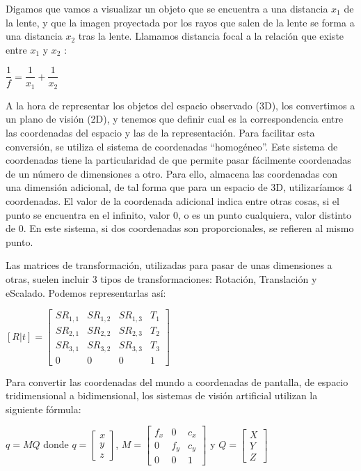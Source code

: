 Digamos que vamos a visualizar un objeto que se encuentra a una distancia $x_{1}$ de la lente, y que la imagen proyectada por los rayos que salen de la lente se forma a una distancia $x_{2}$ tras la lente. Llamamos distancia focal a la relación que existe entre $x_{1}$ y $x_{2}$ :
\begin{center}
$\dfrac{1}{f} = \dfrac{1}{x_{1}} + \dfrac{1}{x_{2}}$
\end{center}

A la hora de representar los objetos del espacio observado (3D), los convertimos a un plano de visión (2D), y tenemos que definir cual es la correspondencia entre las coordenadas del espacio y las de la representación. Para facilitar esta conversión, se utiliza el sistema de coordenadas “homogéneo”. Este sistema de coordenadas tiene la particularidad de que permite pasar fácilmente coordenadas de un número de dimensiones a otro. Para ello, almacena las coordenadas con una dimensión adicional, de tal forma que para un espacio de 3D, utilizaríamos 4 coordenadas. El valor de la coordenada adicional indica entre otras cosas, si el punto se encuentra en el infinito, valor 0, o es un punto cualquiera, valor distinto de 0. En este sistema, si dos coordenadas son proporcionales, se refieren al mismo punto.

Las matrices de transformación, utilizadas para pasar de unas dimensiones a otras, suelen incluir 3 tipos de transformaciones: Rotación, Translación y eScalado. Podemos representarlas así:
\begin{center}
$[R|t] = \begin{bmatrix} SR_{1,1} & SR_{1,2} & SR_{1,3} & T_{1}  \\
                                 SR_{2,1} & SR_{2,2} & SR_{2,3} & T_{2}  \\
                                 SR_{3,1} & SR_{3,2} & SR_{3,3} & T_{3}  \\
                                     0    &     0    &     0    &  1 
                  \end{bmatrix}
$
\end{center}

Para convertir las coordenadas del mundo a coordenadas de pantalla, de espacio tridimensional a bidimensional, los sistemas de visión artificial utilizan la siguiente fórmula:

\begin{center}
$q=MQ$ donde $q=\begin{bmatrix} x \\ y \\ z \end{bmatrix}$, $M=\begin{bmatrix} f_{x} & 0 & c_{x} \\ 0 & f_{y} & c_{y} \\ 0 & 0 & 1 \end{bmatrix}$ y $Q=\begin{bmatrix} X \\ Y \\ Z \end{bmatrix}$
\end{center}

